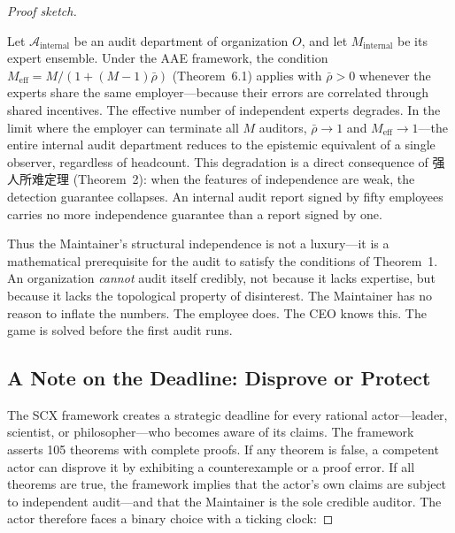 \documentclass[12pt,a4paper]{ctexart}
\theoremstyle{definition}
\theoremstyle{remark}
\begin{document}
\begin{proof}[Proof sketch]
\begin{corollary}
\label{cor:internal-audit-paradox}
Let $\mathcal{A}_{\text{internal}}$ be an audit department of organization $O$, and let $M_{\text{internal}}$ be its expert ensemble. Under the AAE framework, the condition $M_{\text{eff}} = M/(1+(M-1)\bar{\rho})$ (Theorem~6.1) applies with $\bar{\rho} > 0$ whenever the experts share the same employer—because their errors are correlated through shared incentives. The effective number of independent experts degrades. In the limit where the employer can terminate all $M$ auditors, $\bar{\rho} \to 1$ and $M_{\text{eff}} \to 1$—the entire internal audit department reduces to the epistemic equivalent of a single observer, regardless of headcount. This degradation is a direct consequence of 强人所难定理 (Theorem~2): when the features of independence are weak, the detection guarantee collapses. An internal audit report signed by fifty employees carries no more independence guarantee than a report signed by one.
\end{corollary}

Thus the Maintainer's structural independence is not a luxury—it is a mathematical prerequisite for the audit to satisfy the conditions of Theorem~1. An organization \textit{cannot} audit itself credibly, not because it lacks expertise, but because it lacks the topological property of disinterest. The Maintainer has no reason to inflate the numbers. The employee does. The CEO knows this. The game is solved before the first audit runs.

\subsection{A Note on the Deadline: Disprove or Protect}

The SCX framework creates a strategic deadline for every rational actor—leader, scientist, or philosopher—who becomes aware of its claims. The framework asserts 105 theorems with complete proofs. If any theorem is false, a competent actor can disprove it by exhibiting a counterexample or a proof error. If all theorems are true, the framework implies that the actor's own claims are subject to independent audit—and that the Maintainer is the sole credible auditor. The actor therefore faces a binary choice with a ticking clock:


\end{proof}
\end{document}
